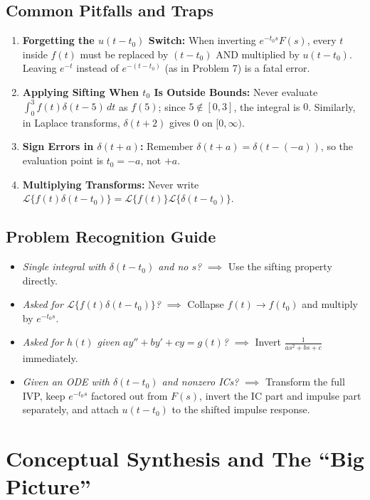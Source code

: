 \documentclass[11pt, letterpaper]{article}
\theoremstyle{definition}
\theoremstyle{remark}
\begin{document}
\subsection{Common Pitfalls and Traps}
\begin{enumerate}
    \item \textbf{Forgetting the $u(t - t_0)$ Switch:} When inverting $e^{-t_0 s}F(s)$, every $t$ inside $f(t)$ must be replaced by $(t - t_0)$ AND multiplied by $u(t - t_0)$. Leaving $e^{-t}$ instead of $e^{-(t - t_0)}$ (as in Problem 7) is a fatal error.
    \item \textbf{Applying Sifting When $t_0$ Is Outside Bounds:} Never evaluate $\int_0^3 f(t)\delta(t - 5)\,dt$ as $f(5)$; since $5 \notin [0, 3]$, the integral is $0$. Similarly, in Laplace transforms, $\delta(t + 2)$ gives $0$ on $[0, \infty)$.
    \item \textbf{Sign Errors in $\delta(t + a)$:} Remember $\delta(t + a) = \delta(t - (-a))$, so the evaluation point is $t_0 = -a$, not $+a$.
    \item \textbf{Multiplying Transforms:} Never write $\mathcal{L}\{f(t)\delta(t - t_0)\} = \mathcal{L}\{f(t)\}\mathcal{L}\{\delta(t - t_0)\}$.
\end{enumerate}

\subsection{Problem Recognition Guide}
\begin{itemize}
    \item \emph{Single integral with $\delta(t - t_0)$ and no $s$?} $\implies$ Use the sifting property directly.
    \item \emph{Asked for $\mathcal{L}\{f(t)\delta(t - t_0)\}$?} $\implies$ Collapse $f(t) \to f(t_0)$ and multiply by $e^{-t_0 s}$.
    \item \emph{Asked for $h(t)$ given $ay'' + by' + cy = g(t)$?} $\implies$ Invert $\frac{1}{as^2 + bs + c}$ immediately.
    \item \emph{Given an ODE with $\delta(t - t_0)$ and nonzero ICs?} $\implies$ Transform the full IVP, keep $e^{-t_0 s}$ factored out from $F(s)$, invert the IC part and impulse part separately, and attach $u(t - t_0)$ to the shifted impulse response.
\end{itemize}

\newpage

\section{Conceptual Synthesis and The ``Big Picture''}
\end{document}
